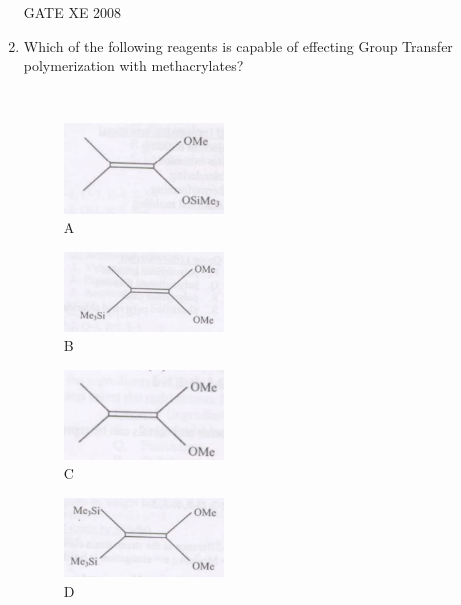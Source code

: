 \documentclass[12pt]{article}
\begin{document}
\begin{enumerate}
 GATE XE 2008

\item Which of the following reagents is capable of effecting Group Transfer polymerization with methacrylates?  

\
\begin{multicols}{2}
 \begin{figure}[H]
    \includegraphics[width=0.4\textwidth]{figs/ass1_h_q11_1.png}
    \caption{A}
    \end{figure}
    
  \begin{figure}[H]
    \includegraphics[width=0.4\textwidth]{figs/ass1_h_q11_2.png}
    \caption{B}
    \end{figure}
 
  \begin{figure}[H]
    \includegraphics[width=0.4\textwidth]{figs/ass1_h_q11_3.png}
    \caption{C}
    \end{figure}
    
  \begin{figure}[H]
    \includegraphics[width=0.4\textwidth]{figs/ass1_h_q11_4.png}
    \caption{D}
    \end{figure}
\end{multicols}    



\end{enumerate}
\end{document}
